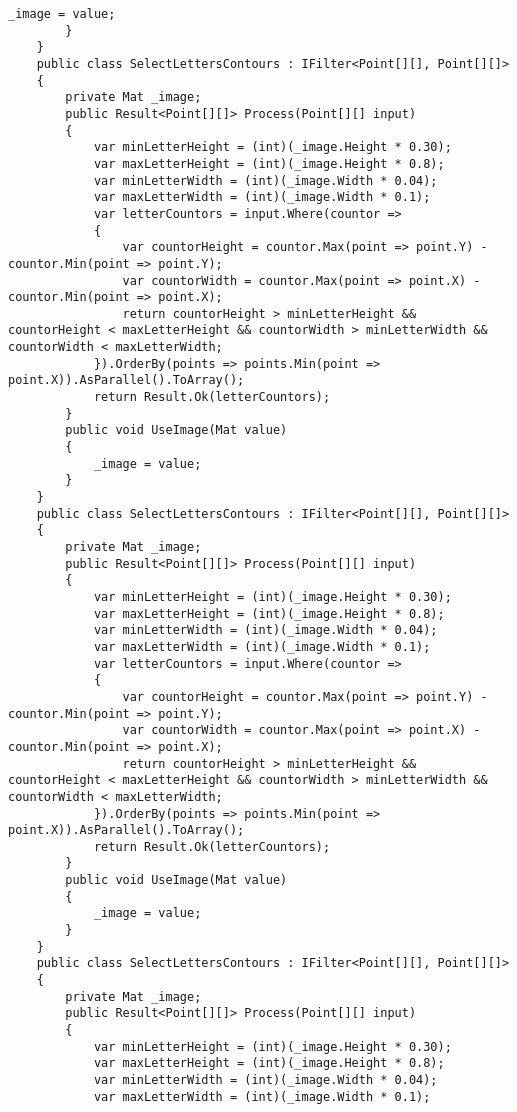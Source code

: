 \begin{lstlisting}[style=fsharpstyle,caption={Исходный код}, label=lst:recognition_result_handler]
            _image = value;
        }
    }
    public class SelectLettersContours : IFilter<Point[][], Point[][]>
    {
        private Mat _image;
        public Result<Point[][]> Process(Point[][] input)
        {
            var minLetterHeight = (int)(_image.Height * 0.30);
            var maxLetterHeight = (int)(_image.Height * 0.8);
            var minLetterWidth = (int)(_image.Width * 0.04);
            var maxLetterWidth = (int)(_image.Width * 0.1);
            var letterCountors = input.Where(countor =>
            {
                var countorHeight = countor.Max(point => point.Y) - countor.Min(point => point.Y);
                var countorWidth = countor.Max(point => point.X) - countor.Min(point => point.X);
                return countorHeight > minLetterHeight && countorHeight < maxLetterHeight && countorWidth > minLetterWidth && countorWidth < maxLetterWidth;
            }).OrderBy(points => points.Min(point => point.X)).AsParallel().ToArray();
            return Result.Ok(letterCountors);
        }
        public void UseImage(Mat value)
        {
            _image = value;
        }
    }
    public class SelectLettersContours : IFilter<Point[][], Point[][]>
    {
        private Mat _image;
        public Result<Point[][]> Process(Point[][] input)
        {
            var minLetterHeight = (int)(_image.Height * 0.30);
            var maxLetterHeight = (int)(_image.Height * 0.8);
            var minLetterWidth = (int)(_image.Width * 0.04);
            var maxLetterWidth = (int)(_image.Width * 0.1);
            var letterCountors = input.Where(countor =>
            {
                var countorHeight = countor.Max(point => point.Y) - countor.Min(point => point.Y);
                var countorWidth = countor.Max(point => point.X) - countor.Min(point => point.X);
                return countorHeight > minLetterHeight && countorHeight < maxLetterHeight && countorWidth > minLetterWidth && countorWidth < maxLetterWidth;
            }).OrderBy(points => points.Min(point => point.X)).AsParallel().ToArray();
            return Result.Ok(letterCountors);
        }
        public void UseImage(Mat value)
        {
            _image = value;
        }
    }
    public class SelectLettersContours : IFilter<Point[][], Point[][]>
    {
        private Mat _image;
        public Result<Point[][]> Process(Point[][] input)
        {
            var minLetterHeight = (int)(_image.Height * 0.30);
            var maxLetterHeight = (int)(_image.Height * 0.8);
            var minLetterWidth = (int)(_image.Width * 0.04);
            var maxLetterWidth = (int)(_image.Width * 0.1);

\end{lstlisting}
